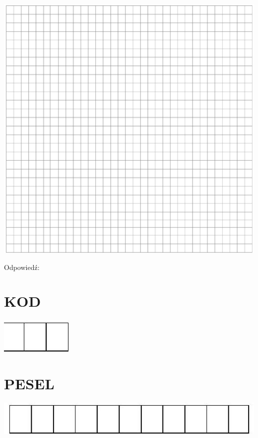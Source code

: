 \documentclass[10pt]{article}
\begin{document}
\includegraphics[max width=\textwidth, center]{2024_11_21_997c30e0b98e62837d84g-19(1)}

Odpowiedź:

\section*{KOD}
\begin{center}
\includegraphics[max width=\textwidth]{2024_11_21_997c30e0b98e62837d84g-20}
\end{center}

\section*{PESEL}
\begin{center}
\includegraphics[max width=\textwidth]{2024_11_21_997c30e0b98e62837d84g-20(1)}
\end{center}
\end{document}
